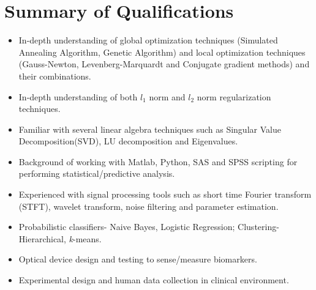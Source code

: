 \documentclass{my_cv}
\begin{document}
\vspace{-2mm}
\begin{center} 
\begin{footnotesize}
\end{footnotesize}

\href{https://www.linkedin.com/in/venkaiahchowdarykavuri}{\textcolor{linkedincolor}{\faLinkedinSquare}} \href{https://github.com/Venki-Kavuri}{\faGithub} \href{https://scholar.google.com/citations?hl=en&user=r5E9ACIAAAAJ&view_op=list_works}{\textcolor{gscholarcolor}{\aiGoogleScholar}} \href{https://www.facebook.com/venki.kavuri}{\textcolor{facebookcolor}{\faFacebookOfficial}}
\end{center} 

\vspace{-9mm} 

\section{Summary of Qualifications}
\begin{itemize}\itemsep 0pt

\item In-depth understanding of global optimization techniques (Simulated Annealing Algorithm, Genetic Algorithm) and local optimization techniques (Gauss-Newton, Levenberg-Marquardt and Conjugate gradient methods) and their combinations.

\item In-depth understanding of both $l_1$ norm and $l_2$  norm regularization techniques.  

\item Familiar with several linear algebra techniques such as Singular Value Decomposition(SVD), LU decomposition and Eigenvalues. 

\item Background of working with Matlab, Python, SAS and SPSS scripting for performing statistical/predictive analysis.

\item Experienced with signal processing tools such as short time Fourier transform (STFT), wavelet transform, noise filtering and parameter estimation.

\item Probabilistic classifiers- Naive Bayes, Logistic Regression; Clustering- Hierarchical, \textit{k}-means.

\item Optical device design and testing to sense/measure biomarkers.

\item Experimental design and human data collection in clinical environment. 
 

\end{itemize}
\vspace{-7mm}
\end{document}
